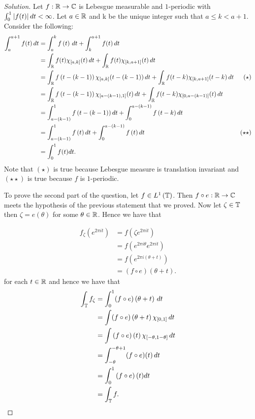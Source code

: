 \begin{proof}[Solution]
Let $f: \mathbb R \to \mathbb C$ is Lebesgue measurable and $1$-periodic with $\int_{0}^{1} \left\lvert f(t) \right\rvert dt < \infty$. Let $a\in \mathbb R$ and k be the unique integer such that $a \le k < a+1$. Consider the following:
\begin{align*}
\int_{a}^{a+1} f(t) \, dt &= \int_{a}^{k} f\left( t \right) \, dt + \int_{k}^{a+1} f(t)\, dt \\
&= \int_{\mathbb R} f(t) \chi_{[a,k]}(t) \, dt + \int_{\mathbb R} f(t) \chi_{[k,a+1]} (t)\,  dt \\
&= \int_{\mathbb R} f\left( t-(k-1) \right) \chi_{[a,k]}(t-(k-1)) \, dt + \int_{\mathbb R} f(t-k) \chi_{[k,a+1]} (t-k)\,  dt & \left( \star \right) \\
&= \int_{\mathbb R} f\left( t-(k-1) \right) \chi_{[a-\left( k-1 \right), 1]}(t) \, dt + \int_{\mathbb R} f(t-k) \chi_{[0,a-(k-1)]} (t)\,  dt \\
&= \int_{a-\left( k-1 \right)}^{1} f\left( t-\left( k-1 \right) \right) dt + \int_{0}^{a-\left( k-1 \right)} f\left( t-k \right) dt \\
&= \int_{a-\left( k-1 \right)}^{1} f\left( t \right) dt + \int_{0}^{a-\left( k-1 \right)} f\left( t \right) dt & \left( \star \star \right) \\
&= \int_{0}^{1} f(t) dt.
\end{align*}
Note that $\left( \star \right)$ is true because Lebesgue measure is translation invariant and $\left( \star \star \right)$ is true because $f$ is $1$-periodic.

To prove the second part of the question, let $f\in L^{1} \left( \mathbb T \right)$. Then $f \circ e : \mathbb R \to \mathbb C$ meets the hypothesis of the previous statement that we proved. Now let $\zeta \in \mathbb T$ then $\zeta = e(\theta)$ for some $\theta \in \mathbb R$. Hence we have that 

\begin{align*}
f_{\zeta} \left( e^{2\pi i t} \right) &=  f\left( \zeta e^{2\pi i t} \right) \\
&= f \left( e^{2\pi i \theta} e^{2\pi i t} \right) \\
&= f \left( e^{2\pi i \left( \theta + t \right)} \right) \\
&= (f \circ e) \left( \theta + t \right).
\end{align*}
for each $t\in \mathbb R$ and hence we have that 
\begin{align*}
\int_{\mathbb T} f_{\zeta} &= \int_{0}^{1} (f\circ e) \left( \theta + t \right) \, dt \\
&=  \int (f \circ e) \left( \theta + t \right) \chi_{[0,1]} \, dt \\
&= \int \left( f \circ e \right) \left( t \right) \chi _{[-\theta, 1-\theta]} \, dt \\
&= \int_{-\theta}^{-\theta +1} (f \circ e)(t) \, dt \\
&= \int_{0}^{1} \left( f \circ e \right) (t) dt \\
&= \int_{\mathbb T} f.
\end{align*}
\end{proof}
